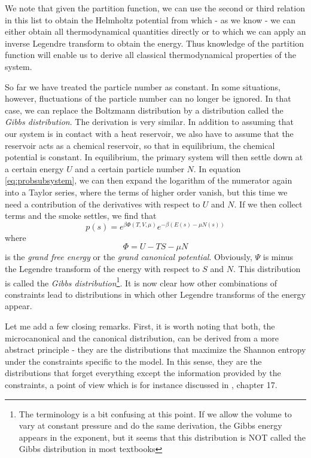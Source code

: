 \documentclass[a4paper, draft]{article}
\theoremstyle{own}
\theoremstyle{remark}
\begin{document}
We note that given the partition function, we can use the second or third relation in this list to obtain the Helmholtz potential from which - as we know - we can either obtain all thermodynamical quantities directly or to which we can apply an inverse Legendre transform to obtain the energy. Thus knowledge of the partition function will enable us to derive all classical thermodynamical properties of the system.


So far we have treated the particle number as constant. In some situations, however, fluctuations of the particle number can no longer be ignored. In that case, we can replace the Boltzmann distribution by a distribution called the {\em Gibbs distribution}. The derivation is very similar. In addition to assuming that our system is in contact with a heat reservoir, we also have to assume that the reservoir acts as a chemical reservoir, so that in equilibrium, the chemical potential is constant. In equilibrium, the primary system will then settle down at a certain energy $U$ and a certain particle number $N$. In equation \ref{eq:probsubsystem}, we can then expand the logarithm of the numerator again into a Taylor series, where the terms of higher order vanish, but this time we need a contribution of the derivatives with respect to $U$ and $N$. If we then collect terms and the smoke settles, we find that 
$$
p(s) = e^{\beta \Phi(T,V,\mu)} e^{-\beta(E(s) - \mu N(s))}
$$
where 
$$
\Phi = U - TS - \mu N
$$
is the {\em grand free energy} or the {\em grand canonical potential}. Obviously, $\Psi$ is minus the Legendre transform of the energy with respect to $S$ and $N$. This distribution is called the 
{\em Gibbs distribution}\footnote{The terminology is a bit confusing at this point. If we allow the volume to vary at constant pressure and do the same derivation, the Gibbs energy appears in the exponent, but it seems that this distribution is NOT called the Gibbs distribution in most textbooks}. It is now clear how other combinations of constraints lead to distributions in which other Legendre transforms of the energy appear. 

Let me add a few closing remarks. First, it is worth noting that both, the microcanonical and the canonical distribution, can be derived from a more abstract principle - they are the distributions that maximize the Shannon entropy under the constraints specific to the model. In this sense, they are the distributions that forget everything except the information provided by the constraints, a point of view which is for instance discussed in \cite{Callen}, chapter 17.
\end{document}
